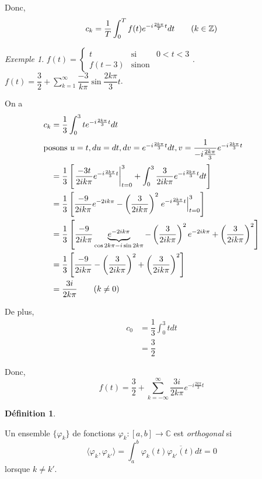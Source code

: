 \documentclass{report}
\newcommand*{\dsum}[4]{\displaystyle\sum_{#1=#2}^{#3}#4}
\newcommand*{\dint}[3]{\displaystyle\int_{#1}^{#2}#3}
\newcommand*{\entiers}{\mathbb{Z}}
\newcommand*{\complexes}{\mathbb{C}}
\theoremstyle{definition}
\newtheorem*{defin}{D\'efinition}
\theoremstyle{remark}
\newtheorem*{exem}{Exemple}
\begin{document}
	Donc,
	\begin{equation*}
		c_k = \dfrac{1}{T} \dint{0}{T}{f(t) e^{-i\frac{2k\pi}{T}t} dt}\tag{$k \in \entiers$}
	\end{equation*}
	\begin{exem}
		$f(t) = \left\{ \begin{array}{lll}
			t&\text{si}&0<t<3\\
			f(t-3)&\text{sinon}
		\end{array} \right.$. $f(t) = \dfrac{3}{2} + \dsum{k}{1}{\infty}{\dfrac{-3}{k\pi} \sin\dfrac{2k\pi}{3}t}$.

		On a
		\begin{align*}
			c_k&= \dfrac{1}{3} \dint{0}{3}{t e^{-i\frac{2k\pi}{3}t} dt}\\
			\intertext{posons $u=t, du=dt, dv=e^{-i\frac{2k\pi}{3}t}dt, v=\dfrac{1}{-i\frac{2k\pi}{3}} e^{-i\frac{2k\pi}{3}t}$}
			&= \dfrac{1}{3} \left[ \left. \dfrac{-3t}{2ik\pi} e^{-i\frac{2k\pi}{3}t} \right|_{t=0}^3 + \dint{0}{3}{\dfrac{3}{2ik\pi} e^{-i\frac{2k\pi}{3}t} dt} \right]\\
			&= \dfrac{1}{3} \left[ \dfrac{-9}{2ik\pi} e^{-2ik\pi} - \left( \dfrac{3}{2ik\pi} \right)^2 \left. e^{-i\frac{2k\pi}{3}t} \right|_{t=0}^3 \right]\\
			&= \dfrac{1}{3} \left[ \dfrac{-9}{2ik\pi} \underbrace{e^{-2ik\pi}}_{\cos2k\pi-i\sin2k\pi} - \left( \dfrac{3}{2ik\pi} \right)^2 e^{-2ik\pi} + \left( \dfrac{3}{2ik\pi} \right)^2 \right]\\
			&= \dfrac{1}{3} \left[ \dfrac{-9}{2ik\pi} - \left( \dfrac{3}{2ik\pi} \right)^2 + \left( \dfrac{3}{2ik\pi} \right)^2 \right]\\
			&= \dfrac{3i}{2k\pi}\tag{$k \neq 0$}
		\end{align*}

		De plus,
		\begin{align*}
			c_0&= \dfrac{1}{3} \dint{0}{3}{t dt}\\
			&= \dfrac{3}{2}
		\end{align*}

		Donc,
		\begin{equation*}
			f(t) = \dfrac{3}{2} + \dsum{k}{-\infty}{\infty}{\dfrac{3i}{2k\pi} e^{-i\frac{2k\pi}{3}t}}\tag{$k \neq 0$}
		\end{equation*}
	\end{exem}
	\begin{defin}~

		Un ensemble $\{\varphi_k\}$ de fonctions $\varphi_k:[a,b] \to \complexes$ est \emph{orthogonal} si
		\begin{equation*}
			\langle \varphi_k, \varphi_{k'} \rangle = \dint{a}{b}{\varphi_k(t) \overline{\varphi_{k'}(t)} dt} = 0
		\end{equation*}
		lorsque $k \neq k'$.
	\end{defin}
\end{document}
